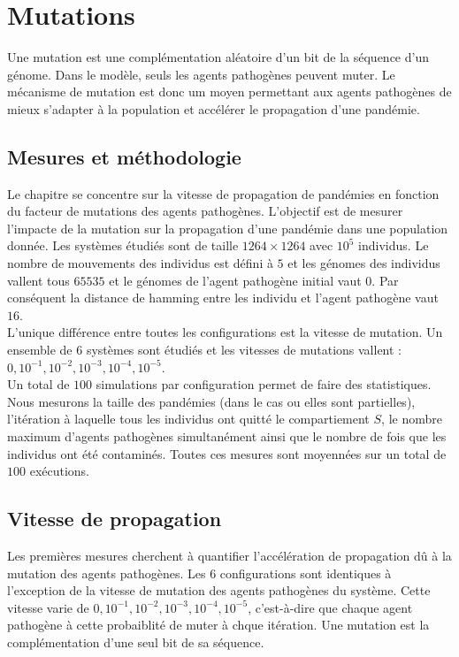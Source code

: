 \chapter{Mutations} \label{ch:mutations}

Une mutation est une complémentation aléatoire d'un bit de la séquence d'un génome. Dans le modèle, seuls les agents pathogènes peuvent muter. Le mécanisme de mutation est donc um moyen permettant aux agents pathogènes de mieux s'adapter à la population et accélérer le propagation d'une pandémie.

\section{Mesures et méthodologie}

Le chapitre se concentre sur la vitesse de propagation de pandémies en fonction du facteur de mutations des agents pathogènes. L'objectif est de mesurer l'impacte de la mutation sur la propagation d'une pandémie dans une population donnée. Les systèmes étudiés sont de taille $1264 \times 1264$ avec $10^5$ individus. Le nombre de mouvements des individus est défini à $5$ et les génomes des individus vallent tous $65535$ et le génomes de l'agent pathogène initial vaut $0$. Par conséquent la distance de hamming entre les individu et l'agent pathogène vaut $16$.\\

L'unique différence entre toutes les configurations est la vitesse de mutation. Un ensemble de $6$ systèmes sont étudiés et les vitesses de mutations vallent : $0,10^{-1},10^{-2},10^{-3},10^{-4},10^{-5}$.\\

Un total de $100$ simulations par configuration permet de faire des statistiques. Nous mesurons la taille des pandémies (dans le cas ou elles sont partielles), l'itération à laquelle tous les individus ont quitté le compartiement $S$, le nombre maximum d'agents pathogènes simultanément ainsi que le nombre de fois que les individus ont été contaminés. Toutes ces mesures sont moyennées sur un total de $100$ exécutions.

\section{Vitesse de propagation}

Les premières mesures cherchent à quantifier l'accélération de propagation dû à la mutation des agents pathogènes. Les $6$ configurations sont identiques à l'exception de la vitesse de mutation des agents pathogènes du système. Cette vitesse varie de $0,10^{-1},10^{-2},10^{-3},10^{-4},10^{-5}$, c'est-à-dire que chaque agent pathogène à cette probaiblité de muter à chque itération. Une mutation est la complémentation d'une seul bit de sa séquence.\\

